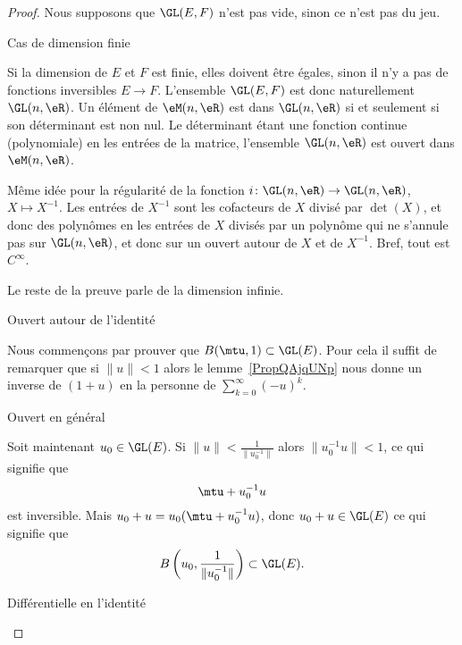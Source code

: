 \begin{proof}
Nous supposons que \( \GL(E,F)\) n'est pas vide, sinon ce n'est pas du jeu.
        \begin{subproof}

        \item[Cas de dimension finie]

            Si la dimension de \( E\) et \( F\) est finie, elles doivent être égales, sinon il n'y a pas de fonctions inversibles \( E\to F\). L'ensemble \( \GL(E,F)\) est donc naturellement \( \GL(n,\eR)\). Un élément de \( \eM(n,\eR)\) est dans \( \GL(n,\eR)\) si et seulement si son déterminant est non nul. Le déterminant étant une fonction continue (polynomiale) en les entrées de la matrice, l'ensemble \( \GL(n,\eR)\) est ouvert dans \( \eM(n,\eR)\).

            Même idée pour la régularité de la fonction \( i\colon \GL(n,\eR)\to \GL(n,\eR)\), \( X\mapsto X^{-1}\). Les entrées de \( X^{-1}\) sont les cofacteurs de \( X\) divisé par \( \det(X)\), et donc des polynômes en les entrées de \( X\) divisés par un polynôme qui ne s'annule pas sur \( \GL(n,\eR)\), et donc sur un ouvert autour de \( X\) et de \( X^{-1}\). Bref, tout est \(  C^{\infty}\).

            Le reste de la preuve parle de la dimension infinie.

        \item[Ouvert autour de l'identité]

        Nous commençons par prouver que \( B(\mtu,1)\subset \GL(E)\). Pour cela il suffit de remarquer que si \( \| u \|<1\) alors le lemme~\ref{PropQAjqUNp} nous donne un inverse de \( (1+u)\) en la personne de \( \sum_{k=0}^{\infty}(-u)^k\).

    \item[Ouvert en général]

        Soit maintenant \( u_0\in\GL(E)\). Si \( \| u \|<\frac{1}{ \| u_0^{-1} \| }\) alors \( \| u_0^{-1}u \|<1\), ce qui signifie que
        \begin{equation}
            \mtu+u_0^{-1}u
        \end{equation}
    est inversible. Mais \( u_0+u=u_0(\mtu+u_0^{-1}u)\), donc \( u_0+u\in\GL(E)\) ce qui signifie que
    \begin{equation}
    B\left( u_0,\frac{1}{ \| u_0^{-1} \| } \right)\subset \GL(E).
    \end{equation}

    \item[Différentielle en l'identité]


\end{subproof}
\end{proof}
